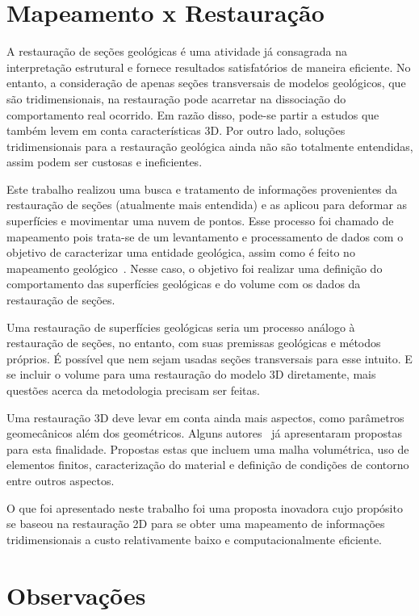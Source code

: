 \section{Mapeamento x Restauração}

A restauração de seções geológicas é uma atividade já consagrada na interpretação estrutural e fornece resultados satisfatórios de maneira eficiente. No entanto, a consideração de apenas seções transversais de modelos geológicos, que são tridimensionais, na restauração pode acarretar na dissociação do comportamento real ocorrido. Em razão disso, pode-se partir a estudos que também levem em conta características 3D. Por outro lado, soluções tridimensionais para a restauração geológica ainda não são totalmente entendidas, assim podem ser custosas e ineficientes.

Este trabalho realizou uma busca e tratamento de informações provenientes da restauração de seções (atualmente mais entendida) e as aplicou para deformar as superfícies e movimentar uma nuvem de pontos. Esse processo foi chamado de mapeamento pois trata-se de um levantamento e processamento de dados com o objetivo de caracterizar uma entidade geológica, assim como é feito no mapeamento geológico~\cite{Geoscan}. Nesse caso, o objetivo foi realizar uma definição do comportamento das superfícies geológicas e do volume com os dados da restauração de seções.

Uma restauração de superfícies geológicas seria um processo análogo à restauração de seções, no entanto, com suas premissas geológicas e métodos próprios. É possível que nem sejam usadas seções transversais para esse intuito. E se incluir o volume para uma restauração do modelo 3D diretamente, mais questões acerca da metodologia precisam ser feitas. 

Uma restauração 3D deve levar em conta ainda mais aspectos, como parâmetros geomecânicos além dos geométricos. Alguns autores~\cite{Santi_3dgeological, Massot, DURANDRIARD2010441} já apresentaram propostas para esta finalidade. Propostas estas que incluem uma malha volumétrica, uso de elementos finitos, caracterização do material e definição de condições de contorno entre outros aspectos.

O que foi apresentado neste trabalho foi uma proposta inovadora cujo propósito se baseou na restauração 2D para se obter uma mapeamento de informações tridimensionais a custo relativamente baixo e computacionalmente eficiente.

\section{Observações}

